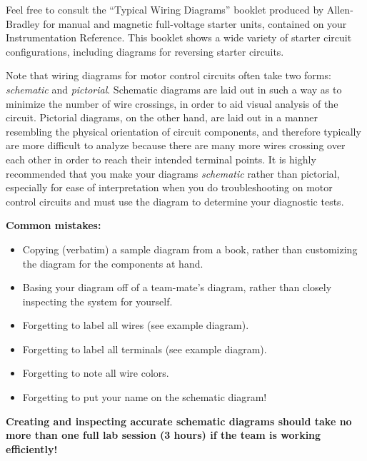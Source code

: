 Feel free to consult the ``Typical Wiring Diagrams'' booklet produced by Allen-Bradley for manual and magnetic full-voltage starter units, contained on your Instrumentation Reference.  This booklet shows a wide variety of starter circuit configurations, including diagrams for reversing starter circuits.

Note that wiring diagrams for motor control circuits often take two forms: {\it schematic} and {\it pictorial}.  Schematic diagrams are laid out in such a way as to minimize the number of wire crossings, in order to aid visual analysis of the circuit.  Pictorial diagrams, on the other hand, are laid out in a manner resembling the physical orientation of circuit components, and therefore typically are more difficult to analyze because there are many more wires crossing over each other in order to reach their intended terminal points.  It is highly recommended that you make your diagrams {\it schematic} rather than pictorial, especially for ease of interpretation when you do troubleshooting on motor control circuits and must use the diagram to determine your diagnostic tests.



\vskip 10pt

{\bf Common mistakes:}

\begin{itemize}
\item{} Copying (verbatim) a sample diagram from a book, rather than customizing the diagram for the components at hand.
\item{} Basing your diagram off of a team-mate's diagram, rather than closely inspecting the system for yourself.
\item{} Forgetting to label all wires (see example diagram).
\item{} Forgetting to label all terminals (see example diagram).
\item{} Forgetting to note all wire colors.
\item{} Forgetting to put your name on the schematic diagram!
\end{itemize}

\vskip 10pt

{\bf Creating and inspecting accurate schematic diagrams should take no more than one full lab session (3 hours) if the team is working efficiently!}

\filbreak




